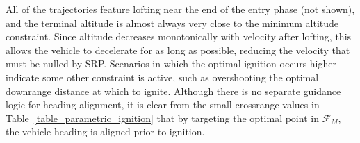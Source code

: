 \documentclass[letterpaper, paper,11pt]{AAS}
\begin{document}
All of the trajectories feature lofting near the end of the entry phase (not shown), and the terminal altitude is almost always very close to the minimum altitude constraint. Since altitude decreases monotonically with velocity after lofting, this allows the vehicle to decelerate for as long as possible, reducing the velocity that must be nulled by SRP. Scenarios in which the optimal ignition occurs higher indicate some other constraint is active, such as overshooting the optimal downrange distance at which to ignite. Although there is no separate guidance logic for heading alignment, it is clear from the small crossrange values in Table~\ref{table_parametric_ignition} that by targeting the optimal point in $\mathcal{F}_M$, the vehicle heading is aligned prior to ignition. 

%
%
\end{document}
